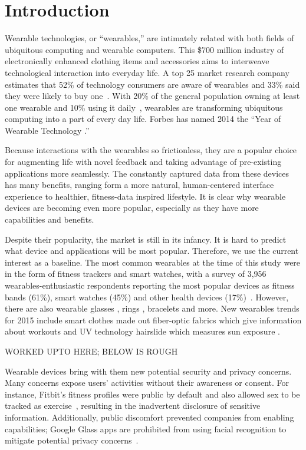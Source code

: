 \section{Introduction}

Wearable technologies, or ``wearables,'' are intimately related with both fields of ubiquitous computing and wearable computers. This \$700 million industry \cite{cmo} of electronically enhanced clothing items and accessories aims to interweave technological interaction into everyday life. A top 25 market research company estimates that 52\% of technology consumers are aware of wearables and 33\% said they were likely to buy one~\cite{NPD}. With 20\% of the general population owning at least one wearable and 10\% using it daily~\cite{WearableStatNews}, wearables are transforming ubiquitous computing into a part of every day life. Forbes has named 2014 the ``Year of Wearable Technology \cite{Forbes}.''

Because interactions with the wearables so frictionless, they are a popular choice for augmenting life with novel feedback and taking advantage of pre-existing applications more seamlessly. The constantly captured data from these devices has many benefits, ranging form a more natural, human-centered interface experience to healthier, fitness-data inspired lifestyle. It is clear why wearable devices are becoming even more popular, especially as they have more capabilities and benefits. 

Despite their popularity, the market is still in its infancy. It is hard to predict what device and applications will be most popular. Therefore, we use the current interest as a baseline. The most common wearables at the time of this study were in the form of fitness trackers and smart watches, with a survey of 3,956 wearables-enthusiastic respondents reporting the most popular devices as fitness bands (61\%), smart watches (45\%) and other health devices (17\%)~\cite{Nilsen}.  However, there are also wearable glasses \cite{ 2_google_2014, 3_sony_global_2014}, rings \cite{4_ringly_2014}, bracelets \cite{5_intel_2014} and more. New wearables trends for 2015 include smart clothes made out fiber-optic fabrics which give information about workouts and UV technology hairslide which measures sun exposure \cite{1_digital_trends_2014, 2_arthur_2014}.


{\color {RED} WORKED UPTO HERE; BELOW IS ROUGH}

Wearable devices bring with them new potential security and privacy concerns. Many concerns expose users' activities without their awareness or consent. For instance, Fitbit's fitness profiles were public by default and also allowed sex to be tracked as exercise~\cite{Fitbit}, resulting in the inadvertent disclosure of sensitive information. Additionally, public discomfort prevented companies from enabling capabilities; Google Glass apps are prohibited from using facial recognition to mitigate potential privacy concerns~\cite{GlassDetection}.

